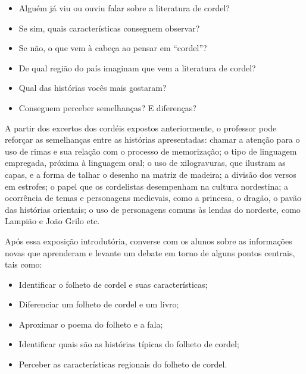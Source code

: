 \documentclass[11pt]{extarticle}
\begin{document}
\begin{itemize}
\item Alguém já viu ou ouviu falar sobre a literatura de cordel?

\item Se sim, quais características conseguem observar?

\item Se não, o que vem à cabeça ao pensar em ``cordel''?

\item De qual região do país imaginam que vem a literatura de cordel?

\item Qual das histórias vocês mais gostaram?

\item Conseguem perceber semelhanças? E diferenças?
\end{itemize}

A partir dos excertos dos cordéis expostos anteriormente, o professor pode reforçar as semelhanças entre as histórias apresentadas: chamar a atenção para o uso de rimas e sua relação com o processo de memorização; o tipo de linguagem empregada, próxima à linguagem oral; o uso de xilogravuras, que ilustram as capas, e a forma de talhar o desenho na matriz de madeira; a divisão dos versos em estrofes; o papel que os cordelistas desempenham na cultura nordestina; a ocorrência de temas e personagens medievais, como a princesa, o dragão, o pavão das histórias orientais; o uso de personagens comuns às lendas do nordeste, como Lampião e João Grilo etc.


Após essa exposição introdutória, converse com os alunos sobre as informações novas que aprenderam e levante um debate em torno de alguns pontos centrais, tais como:

\begin{itemize}
\item Identificar o folheto de cordel e suas características;

\item Diferenciar um folheto de cordel e um livro;

\item Aproximar o poema do folheto e a fala;

\item Identificar quais são as histórias típicas do folheto de cordel;

\item Perceber as características regionais do folheto de cordel.
\end{itemize}
\end{document}
